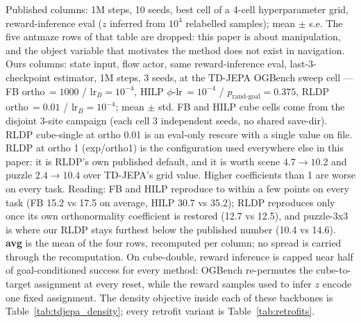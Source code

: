 \begin{table}[t]
\begin{minipage}{\linewidth}\scriptsize\raggedright
Published columns: 1M steps, 10 seeds, best cell of a 4-cell hyperparameter grid, reward-inference eval ($z$ inferred from $10^4$ relabelled samples); mean $\pm$ s.e. The five antmaze rows of that table are dropped: this paper is about manipulation, and the object variable that motivates the method does not exist in navigation.
Ours columns: state input, flow actor, same reward-inference eval, last-3-checkpoint estimator, 1M steps, 3 seeds, at the TD-JEPA OGBench sweep cell --- FB ortho\,$=1000$ / lr$_B=10^{-4}$, HILP $\phi$-lr\,$=10^{-4}$ / $p_{\mathrm{rand\text{-}goal}}=0.375$, RLDP ortho\,$=0.01$ / lr$_B=10^{-4}$; mean $\pm$ std. FB and HILP cube cells come from the disjoint 3-site campaign (each cell 3 independent seeds, no shared save-dir). RLDP cube-single at ortho 0.01 is an eval-only rescore with a single value on file.
RLDP at ortho 1 (exp/ortho1) is the configuration used everywhere else in this paper: it is RLDP's own published default, and it is worth scene $4.7\to10.2$ and puzzle $2.4\to10.4$ over TD-JEPA's grid value. Higher coefficients than 1 are worse on every task.
Reading: FB and HILP reproduce to within a few points on every task (FB 15.2 vs 17.5 on average, HILP 30.7 vs 35.2); RLDP reproduces only once its own orthonormality coefficient is restored (12.7 vs 12.5), and puzzle-3x3 is where our RLDP stays furthest below the published number (10.4 vs 14.6).
\textbf{avg} is the mean of the four rows, recomputed per column; no spread is carried through the recomputation.
On cube-double, reward inference is capped near half of goal-conditioned success for every method: OGBench re-permutes the cube-to-target assignment at every reset, while the reward samples used to infer $z$ encode one fixed assignment.
The density objective inside each of these backbones is Table~\ref{tab:tdjepa_density}; every retrofit variant is Table~\ref{tab:retrofits}.
\end{minipage}
\end{table}
